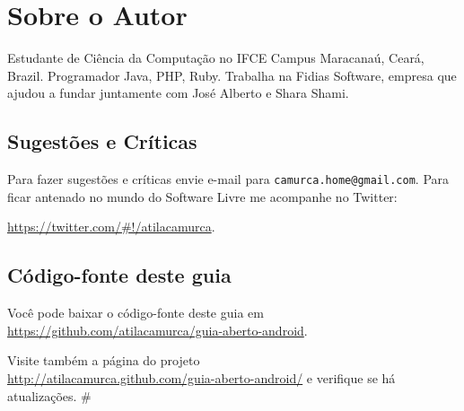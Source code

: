 \chapter{Sobre o Autor}

Estudante de Ciência da Computação no IFCE Campus Maracanaú, Ceará,
Brazil. Programador Java, PHP, Ruby. Trabalha na Fidias Software,
empresa que ajudou a fundar juntamente com José Alberto e Shara Shami.

\section{Sugestões e Críticas}

Para fazer sugestões e críticas envie e-mail para
\texttt{camurca.home@gmail.com}. Para ficar antenado no mundo do
Software Livre me acompanhe no Twitter:

\url{https://twitter.com/#!/atilacamurca}.

\section{Código-fonte deste guia}

Você pode baixar o código-fonte deste guia
em\\\url{https://github.com/atilacamurca/guia-aberto-android}.

Visite também a página do
projeto\\\url{http://atilacamurca.github.com/guia-aberto-android/} e
verifique se há atualizações. \#
